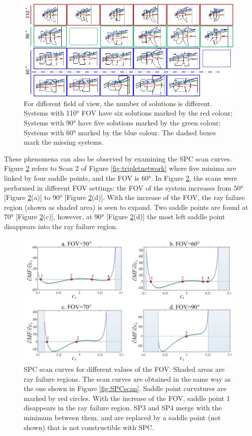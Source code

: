 \begin{figure}[h!]
    \centering
    \includegraphics[width=1.0\textwidth]{chapter-3/figures/FOVvarying.png}
    \caption{For different field of view, the number of solutions is different. Systems with 110° FOV have six solutions marked by the red colour; Systems with 90° have five solutions marked by the green colour; Systems with 60° marked by the blue colour. The dashed boxes mark the missing systems.}
    \label{fig:FOVvarying}
\end{figure}

These phenomena can also be observed by examining the SPC scan curves. Figure \ref{fig:phasechange_field} refers to Scan 2 of Figure \ref{fig:tripletnetwork} where five minima are linked by four saddle points, and the FOV is 60°. In Figure \ref{fig:phasechange_field}, the scans were performed in different FOV settings: the FOV of the system increases from 50° [Figure \ref{fig:phasechange_field}(a)] to 90° [Figure \ref{fig:phasechange_field}(d)]. With the increase of the FOV, the ray failure region (shown as shaded area) is seen to expand. Two saddle points are found at 70° [Figure \ref{fig:phasechange_field}(c)], however, at 90° [Figure \ref{fig:phasechange_field}(d)] the most left saddle point disappears into the ray failure region.
\begin{figure}[h!]
    \centering
    \includegraphics[width=.85\textwidth]{chapter-3/figures/PhaseTransition_field.png}
    \caption{SPC scan curves for different values of the FOV. Shaded areas are ray failure regions. The scan curves are obtained in the same way as the one shown in Figure \ref{fig:SPCscan}. Saddle point curvatures are marked by red circles. With the increase of the FOV, saddle point 1 disappears in the ray failure region. SP3 and SP4 merge with the minimum between them, and are replaced by a saddle point (not shown) that is not constructible with SPC.}
    \label{fig:phasechange_field}
\end{figure}

